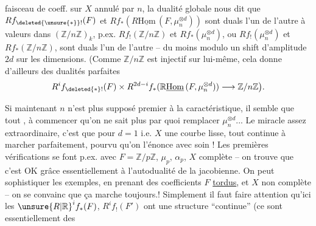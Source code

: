 faisceau de coeff. sur $X$ annulé par $n$, la dualité globale nous dit que $Rf_{\deleted{\unsure{*}}!}(F)$ et $Rf_*(R\underline{\mathrm{Hom}}\,(F,\mu_n^{\otimes d}))$ sont duals l'un de l'autre à valeurs dans $(\mathbb{Z}/n\mathbb{Z})_k$, p.ex. $Rf_!(\mathbb{Z}/n\mathbb{Z})$ et $Rf_*(\mu_n^{\otimes d})$, ou $Rf_!(\mu_n^{\otimes d})$ et $Rf_*(\mathbb{Z}/n\mathbb{Z})$, sont duals l'un de l'autre -- du moins modulo un shift d'amplitude $2d$ sur les dimensions. (Comme $\mathbb{Z}/n\mathbb{Z}$ est injectif sur lui-même, cela donne d'ailleurs des dualités parfaites
\[
R^{i}f_{\deleted{*}!}(F)\times R^{2d-i}f_*(\mathbb{R}\underline{\mathrm{Hom}}\,(F,\mu_n^{\otimes d}))\longrightarrow\mathbb{Z}/n\mathbb{Z}\big{)}.
\]

Si maintenant $n$ n'est plus supposé premier à la caractéristique,  il semble que tout , à commencer qu'on ne sait plus  par quoi remplacer $\mu_n^{\otimes d}$... Le miracle assez extraordinaire, c'est que pour $d=1$ i.e. $X$ une courbe lisse, tout continue à marcher parfaitement, pourvu qu'on l'énonce avec soin ! Les premières vérifications se font p.ex. avec $F=\mathbb{Z}/p\mathbb{Z}$, $\mu_p$, $\alpha_p$, $X$ complète -- on trouve que c'est OK grâce essentiellement à l'autodualité de la jacobienne. On peut sophistiquer les exemples, en prenant des coefficients $F$ \uline{tordus}, et $X$ non complète -- on se convainc que ça marche toujours.! Simplement il faut faire attention qu'ici les ${\unsure{R|\mathbb{R}}}^if_*(F)$, $R^if_!(F')$ ont une structure ``continue'' (ce sont essentiellement des  
